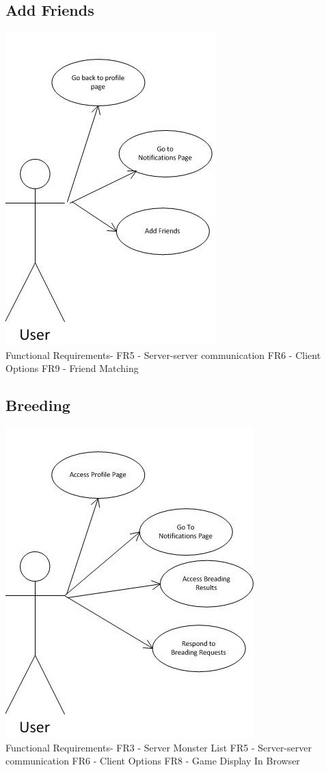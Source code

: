\documentclass{project}
\begin{document}
\newpage
\subsection{Add Friends}
\includegraphics[scale=0.6]{AddFriendsPageUseCase.jpg}
\\
Functional Requirements-
FR5 - Server-server communication
FR6 - Client Options
FR9 - Friend Matching

\newpage
\subsection{Breeding}
\includegraphics[scale=0.6]{BreedingPageUseCase.jpg}
\\
Functional Requirements-
FR3 - Server Monster List
FR5 - Server-server communication
FR6 - Client Options
FR8 - Game Display In Browser
\end{document}

